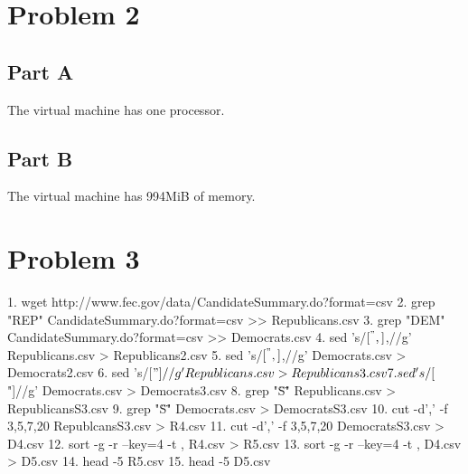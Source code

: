 \section{Problem 2}
\subsection{Part A}
The virtual machine has one processor.
\subsection{Part B}
The virtual machine has 994MiB of memory.
\section{Problem 3}
1. wget http://www.fec.gov/data/CandidateSummary.do?format=csv
2. grep "REP" CandidateSummary.do?format=csv >> Republicans.csv
3. grep "DEM" CandidateSummary.do?format=csv >> Democrats.csv
4. sed 's/\([^",]\),/\1/g' Republicans.csv > Republicans2.csv
5. sed 's/\([^",]\),/\1/g' Democrats.csv > Democrats2.csv
6. sed 's/[$"]//g' Republicans.csv > Republicans3.csv
7. sed 's/[$"]//g' Democrats.csv > Democrats3.csv
8. grep "\"S\"" Republicans.csv > RepublicansS3.csv
9. grep "\"S\"" Democrats.csv > DemocratsS3.csv
10. cut -d',' -f 3,5,7,20 RepublcansS3.csv > R4.csv
11. cut -d',' -f 3,5,7,20 DemocratsS3.csv > D4.csv
12. sort -g -r --key=4 -t , R4.csv > R5.csv
13. sort -g -r --key=4 -t , D4.csv > D5.csv
14. head -5 R5.csv
15. head -5 D5.csv


